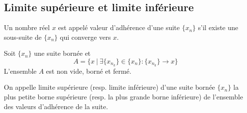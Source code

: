 	\subsection{Limite supérieure et limite inférieure}
	\begin{mydef}
		Un nombre réel $x$ est appelé valeur d'adhérence d'une suite $\{x_n\}$ s'il existe une sous-suite de $\{x_n\}$ qui converge vers $x$.
	\end{mydef}
	\begin{mythm}
		Soit $\{x_n\}$ une suite bornée et \[A=\{x~|~\exists\{x_{n_k}\}\in\{x_n\} : \{x_{n_k}\}\longrightarrow x \}\]
		L'ensemble $A$ est non vide, borné et fermé.
	\end{mythm}
	\begin{mydef}
		On appelle limite supérieure (resp. limite inférieure) d'une suite bornée $\{x_n\}$ la plus petite borne supérieure (resp. la plus grande borne inférieure) de l'ensemble des valeurs d'adhérence de la suite.
	\end{mydef}